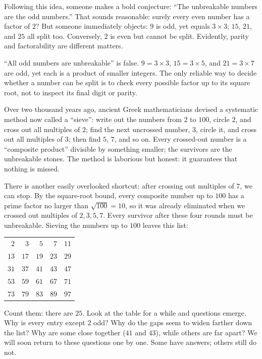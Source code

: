 Following this idea, someone makes a bold conjecture: ``The unbreakable numbers are the odd numbers.'' That sounds reasonable: surely every even number has a factor of $2$? But someone immediately objects: $9$ is odd, yet equals $3\times 3$; $15$, $21$, and $25$ all split too. Conversely, $2$ is even but cannot be split. Evidently, parity and factorability are different matters.

\begin{fanli}
``All odd numbers are unbreakable'' is false. $9=3\times3$, $15=3\times5$, and $21=3\times7$ are odd, yet each is a product of smaller integers. The only reliable way to decide whether a number can be split is to check every possible factor up to its square root, not to inspect its final digit or parity.
\end{fanli}

Over two thousand years ago, ancient Greek mathematicians devised a systematic method now called a ``sieve'': write out the numbers from $2$ to $100$, circle $2$, and cross out all multiples of $2$; find the next uncrossed number, $3$, circle it, and cross out all multiples of $3$; then find $5$, $7$, and so on. Every crossed-out number is a ``composite product'' divisible by something smaller; the survivors are the unbreakable stones. The method is laborious but honest: it guarantees that nothing is missed.

There is another easily overlooked shortcut: after crossing out multiples of $7$, we can stop. By the square-root bound, every composite number up to $100$ has a prime factor no larger than $\sqrt{100}=10$, so it was already eliminated when we crossed out multiples of $2,3,5,7$. Every survivor after these four rounds must be unbreakable. Sieving the numbers up to $100$ leaves this list:

\begin{center}
\begin{tabular}{rrrrr}
\toprule
$2$ & $3$ & $5$ & $7$ & $11$\\
$13$ & $17$ & $19$ & $23$ & $29$\\
$31$ & $37$ & $41$ & $43$ & $47$\\
$53$ & $59$ & $61$ & $67$ & $71$\\
$73$ & $79$ & $83$ & $89$ & $97$\\
\bottomrule
\end{tabular}
\end{center}

Count them: there are $25$. Look at the table for a while and questions emerge. Why is every entry except $2$ odd? Why do the gaps seem to widen farther down the list? Why are some close together ($41$ and $43$), while others are far apart? We will soon return to these questions one by one. Some have answers; others still do not.

